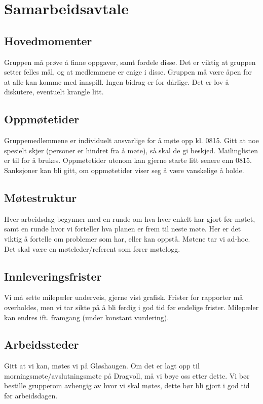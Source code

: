 \appendix {}
\section{Samarbeidsavtale} \label{A} 
\subsection{Hovedmomenter}
Gruppen må prøve å finne oppgaver, samt fordele disse. Det er viktig at gruppen setter felles mål, og at medlemmene er enige i disse. Gruppen må være åpen for at alle kan komme med innspill. Ingen bidrag er for dårlige. Det er lov å diskutere, eventuelt krangle litt.
\subsection{Oppmøtetider}
Gruppemedlemmene er individuelt ansvarlige for å møte opp kl. 0815. Gitt at noe spesielt skjer (personer er hindret fra å møte), så skal de gi beskjed. Mailinglisten er til for å brukes. Oppmøtetider utenom kan gjerne starte litt senere enn 0815. Sanksjoner kan bli gitt, om oppmøtetider viser seg å være vanskelige å holde.
\subsection{Møtestruktur}
Hver arbeidsdag begynner med en runde om hva hver enkelt har gjort før møtet, samt en runde hvor vi forteller hva planen er frem til neste møte. Her er det viktig å fortelle om problemer som har, eller kan oppstå. Møtene tar vi ad-hoc. Det skal være en møteleder/referent som fører møtelogg.
\subsection{Innleveringsfrister}
Vi må sette milepæler underveis, gjerne vist grafisk. Frister for rapporter må overholdes, men vi tar sikte på å bli ferdig i god tid før endelige frister. Milepæler kan endres ift. framgang (under konstant vurdering).
\subsection{Arbeidssteder}
Gitt at vi kan, møtes vi på Gløshaugen. Om det er lagt opp til morningsmøte/avslutningsmøte på Dragvoll, må vi bøye oss etter dette. Vi bør bestille grupperom avhengig av hvor vi skal møtes, dette bør bli gjort i god tid før arbeidsdagen.

